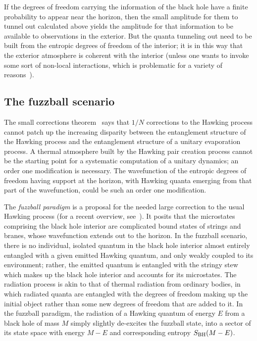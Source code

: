 \documentclass[11pt]{article}
\newcommand{\rcite}{\cite}
\def\BH{{\rm BH}}
\numberwithin{equation}{section}
\begin{document}
If the degrees of freedom carrying the information of the black hole have a finite probability to appear near the horizon, then the small amplitude for them to tunnel out calculated above yields the amplitude for that information to be available to observations in the exterior.  But the quanta tunneling out need to be built from the entropic degrees of freedom of the interior; it is in this way that the exterior atmosphere is coherent with the interior (unless one wants to invoke some sort of non-local interactions, which is problematic for a variety of reasons~\rcite{Martinec:2022lsb}).










\subsection{The fuzzball scenario}
\label{sec:fuzzballs}

The small corrections theorem~\rcite{Mathur:2009hf,Guo:2021blh} says that $1/N$ corrections to the Hawking process cannot patch up the increasing disparity between the entanglement structure of the Hawking process and the entanglement structure of a unitary evaporation process.  A thermal atmosphere built by the Hawking pair creation process cannot be the starting point for a systematic computation of a unitary dynamics; an order one modification is necessary.  The wavefunction of the entropic degrees of freedom having support at the horizon, with Hawking quanta emerging from that part of the wavefunction, could be such an order one modification.


The {\it fuzzball paradigm} is a proposal for the needed large correction to the usual Hawking process 
(for a recent overview, see~\rcite{Bena:2022rna}).  It posits that the microstates comprising the black hole interior are complicated bound states of strings and branes, whose wavefunction extends out to the horizon.  In the fuzzball scenario, there is no individual, isolated quantum in the black hole interior almost entirely entangled with a given emitted Hawking quantum, and only weakly coupled to its environment; rather, the emitted quantum is entangled with the stringy stew which makes up the black hole interior and accounts for its microstates.  The radiation process is akin to that of thermal radiation from ordinary bodies, in which radiated quanta are entangled with the degrees of freedom making up the initial object rather than some new degrees of freedom that are added to it.
%
In the fuzzball paradigm, the radiation of a Hawking quantum of energy $E$ from a black hole of mass $M$ simply slightly de-excites the fuzzball state, into a sector of its state space with energy $M-E $ and corresponding entropy $S_\BH(M-E )$.
\end{document}
